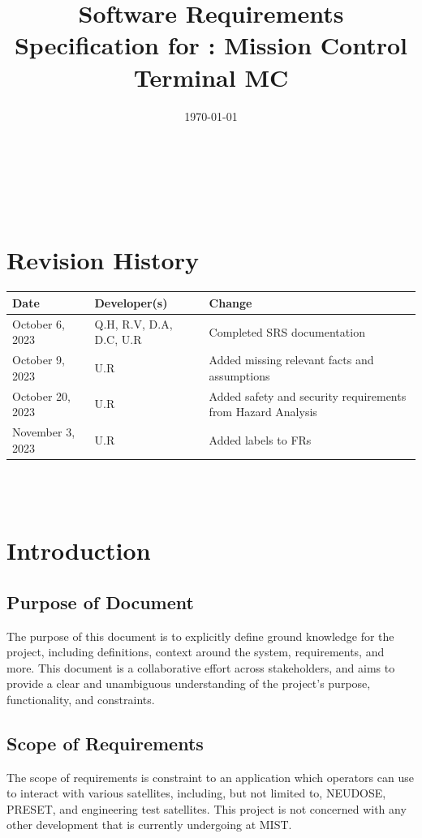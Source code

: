 \documentclass[12pt]{article}
\begin{document}
\title{Software Requirements Specification for \progname: Mission Control Terminal MC} 
\author{\authname}
\date{\today}
	
\maketitle

~\newpage


\tableofcontents

~\newpage

\section*{Revision History}
\begin{table}[hp]
\label{TblRevisionHistory}
\begin{tabularx}{\textwidth}{llX}
\toprule
\textbf{Date} & \textbf{Developer(s)} & \textbf{Change}\\
\midrule
October 6, 2023 & Q.H, R.V, D.A, D.C, U.R & Completed SRS documentation\\
October 9, 2023 & U.R & Added missing relevant facts and assumptions\\
October 20, 2023 & U.R & Added safety and security requirements from Hazard Analysis\\
November 3, 2023 & U.R & Added labels to FRs\\
\bottomrule
\end{tabularx}
\end{table}


~\\

~\newpage

\section{Introduction}
\subsection{Purpose of Document}
The purpose of this document is to explicitly define ground knowledge for the project, including definitions, context around the system, requirements, and more. This document is a collaborative effort across stakeholders, and aims to provide a clear and unambiguous understanding of the project’s purpose, functionality, and constraints.

\subsection{Scope of Requirements}
The scope of requirements is constraint to an application which operators can use to interact with various satellites, including, but not limited to, NEUDOSE, PRESET, and engineering test satellites. This project is not concerned with any other development that is currently undergoing at MIST.
\end{document}
